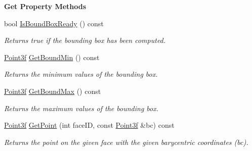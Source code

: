 \begin{Indent}\textbf{ Get Property Methods}\par
\begin{DoxyCompactItemize}
\item 
\mbox{\label{classcy_1_1_tri_mesh_a1a1b72b9e92dc08798b05af712bc275f}} 
bool \mbox{\hyperlink{classcy_1_1_tri_mesh_a1a1b72b9e92dc08798b05af712bc275f}{Is\+Bound\+Box\+Ready}} () const
\begin{DoxyCompactList}\small\item\em Returns true if the bounding box has been computed. \end{DoxyCompactList}\item 
\mbox{\label{classcy_1_1_tri_mesh_afd6a879b2a76df71f25c78a96bca6630}} 
\mbox{\hyperlink{cy_point_8h_aa1aa4fec5c403aa116dc50e9e94f85aa}{Point3f}} \mbox{\hyperlink{classcy_1_1_tri_mesh_afd6a879b2a76df71f25c78a96bca6630}{Get\+Bound\+Min}} () const
\begin{DoxyCompactList}\small\item\em Returns the minimum values of the bounding box. \end{DoxyCompactList}\item 
\mbox{\label{classcy_1_1_tri_mesh_a617c04a6de649e0430be48b9af0c7ae2}} 
\mbox{\hyperlink{cy_point_8h_aa1aa4fec5c403aa116dc50e9e94f85aa}{Point3f}} \mbox{\hyperlink{classcy_1_1_tri_mesh_a617c04a6de649e0430be48b9af0c7ae2}{Get\+Bound\+Max}} () const
\begin{DoxyCompactList}\small\item\em Returns the maximum values of the bounding box. \end{DoxyCompactList}\item 
\mbox{\label{classcy_1_1_tri_mesh_a7cdf9b7a24c70c3f838269ef49f608e5}} 
\mbox{\hyperlink{cy_point_8h_aa1aa4fec5c403aa116dc50e9e94f85aa}{Point3f}} \mbox{\hyperlink{classcy_1_1_tri_mesh_a7cdf9b7a24c70c3f838269ef49f608e5}{Get\+Point}} (int face\+ID, const \mbox{\hyperlink{cy_point_8h_aa1aa4fec5c403aa116dc50e9e94f85aa}{Point3f}} \&bc) const
\begin{DoxyCompactList}\small\item\em Returns the point on the given face with the given barycentric coordinates (bc). \end{DoxyCompactList}\item 

\end{DoxyCompactItemize}
\end{Indent}
